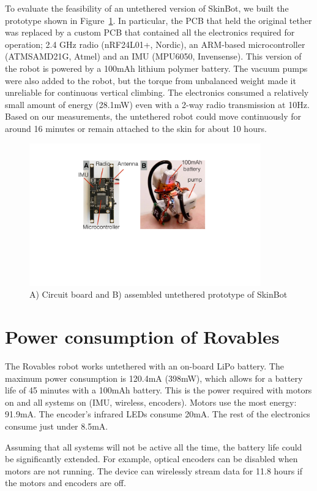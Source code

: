To evaluate the feasibility of an untethered version of SkinBot, we built the prototype shown in Figure~\ref{fig:untethered_prototype}. In particular, the PCB that held the original tether was replaced by a custom PCB that contained all the electronics required for operation; 2.4 GHz radio (nRF24L01+, Nordic), an ARM-based microcontroller (ATMSAMD21G, Atmel) and an IMU (MPU6050, Invensense). This version of the robot is powered by a 100mAh lithium polymer battery. The vacuum pumps were also added to the robot, but the torque from unbalanced weight made it unreliable for continuous vertical climbing. The electronics consumed a relatively small amount of energy (28.1mW) even with a 2-way radio transmission at 10Hz. Based on our measurements, the untethered robot could move continuously for around 16 minutes or remain attached to the skin for about 10 hours.

\begin{figure}[!ht]
\centering
\includegraphics[width=10.0cm]{pictures/chapter3/untethered_prototype.pdf}
\caption{A) Circuit board and B) assembled untethered prototype of SkinBot}
\label{fig:untethered_prototype}
\end{figure}

\section{Power consumption of Rovables}
The Rovables robot works untethered with an on-board LiPo battery. The maximum power consumption is 120.4mA (398mW), which allows for a battery life of 45 minutes with a 100mAh battery. This is the power required with motors on and all systems on (IMU, wireless, encoders). Motors use the most energy: 91.9mA. The encoder's infrared LEDs consume 20mA. The rest of the electronics consume just under 8.5mA. 

Assuming that all systems will not be active all the time, the battery life could be significantly extended. For example, optical encoders can be disabled when motors are not running. 
The device can wirelessly stream data for 11.8 hours if the motors and encoders are off. 




